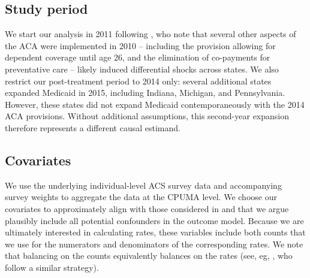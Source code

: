 \documentclass[12pt]{article}
\begin{document}
\subsection{Study period}

We start our analysis in 2011 following \cite{courtemanche2017early}, who note that several other aspects of the ACA were implemented in 2010 -- including the provision allowing for dependent coverage until age 26, and the elimination of co-payments for preventative care -- likely induced differential shocks across states. We also restrict our post-treatment period to 2014 only: several additional states expanded Medicaid in 2015, including Indiana, Michigan, and Pennsylvania. However, these states did not expand Medicaid contemporaneously with the 2014 ACA provisions. Without additional assumptions, this second-year expansion therefore represents a different causal estimand. 

\subsection{Covariates}

We use the underlying individual-level ACS survey data and accompanying survey weights to aggregate the data at the CPUMA level. We choose our covariates to approximately align with those considered in \cite{courtemanche2017early} and that we argue plausibly include all potential confounders in the outcome model. Because we are ultimately interested in calculating rates, these variables include both counts that we use for the numerators and denominators of the corresponding rates. We note that balancing on the counts equivalently balances on the rates (see, eg, \cite{robbins2017framework}, who follow a similar strategy).
\end{document}
